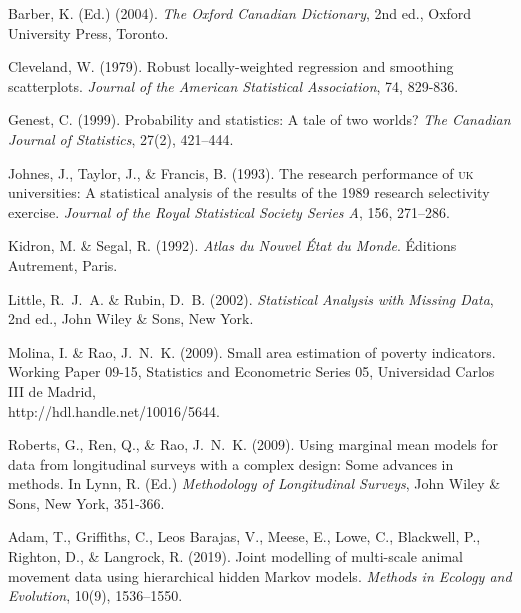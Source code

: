 
\begin{thebibliography}{}
Barber, K. (Ed.) (2004). {\it The Oxford Canadian Dictionary}, 2nd ed., 
Oxford University Press, Toronto.

Cleveland, W. (1979). Robust locally-weighted regression and smoothing scatterplots. 
{\it Journal of the American Statistical Association}, 74, 829-836.

Genest, C. (1999). Probability and statistics: A tale of two worlds? 
{\it The Canadian Journal of Statistics}, 27(2), 421--444.

Johnes, J., Taylor, J., \& Francis, B. (1993). The research
performance of \textsc{uk} universities: A statistical analysis of the results
of the 1989 research selectivity exercise. {\it Journal of the Royal
Statistical Society Series A}, 156, 271--286.

Kidron, M. \& Segal, R. (1992). {\it Atlas du Nouvel \'Etat
du Monde}. \'Editions Autrement, Paris.

Little, R.~J.~A. \& Rubin, D.~B. (2002). {\it Statistical Analysis with Missing Data}, 2nd ed., 
John Wiley \& Sons, New York.

Molina, I. \& Rao, J.~N.~K. (2009). Small area estimation of poverty indicators. Working Paper 09-15, Statistics and Econometric Series 05, Universidad Carlos III de Madrid, \\http://hdl.handle.net/10016/5644.

Roberts, G., Ren, Q., \& Rao, J.~N.~K. (2009). 
Using marginal mean models for data from longitudinal surveys
with a complex design: Some advances in methods. In Lynn, R. (Ed.) {\it Methodology of Longitudinal Surveys}, 
John Wiley \& Sons, New York, 351-366.


Adam, T., Griffiths, C., Leos Barajas, V., Meese, E., Lowe, C., Blackwell, P., Righton, D., \& Langrock, R. (2019).
Joint modelling of multi-scale animal movement data using hierarchical hidden Markov models.
{\it Methods in Ecology and Evolution}, 10(9), 1536–1550.


\end{thebibliography}
